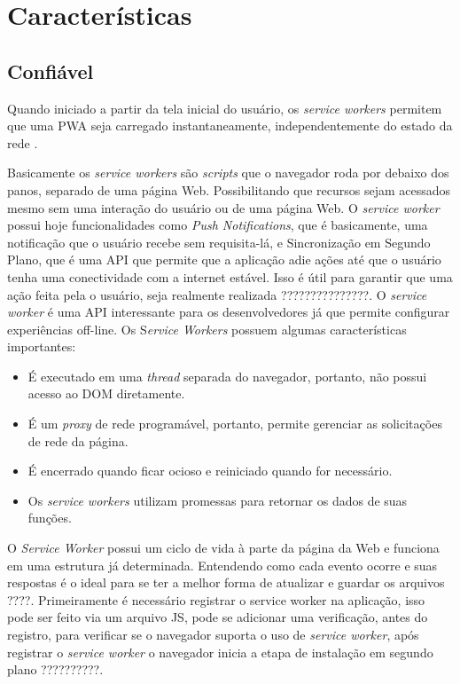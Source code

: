 \section{Características}
\label{s_c4_caractetisticas}

\subsection{Confiável}
Quando iniciado a partir da tela inicial do usuário, os \textit{service workers} permitem que uma \ac{PWA} seja carregado instantaneamente, independentemente do estado da rede \cite{pwa}.


Basicamente os \textit{service workers} são \textit{scripts} que o navegador roda por debaixo dos panos, separado de uma página Web. Possibilitando que recursos sejam acessados mesmo sem uma interação do usuário ou de uma página Web. O \textit{service worker} possui hoje funcionalidades como \textit{Push Notifications}, que é basicamente, uma notificação que o usuário recebe sem requisita-lá, e Sincronização em Segundo Plano, que é uma \ac{API} que permite que a aplicação adie ações até que o usuário tenha uma conectividade com a internet estável. Isso é útil para garantir que uma ação feita pela o usuário, seja realmente realizada \cite{servicework} ???????????????.
O \textit{service worker} é uma \ac{API} interessante para os desenvolvedores já que permite configurar experiências off-line. Os S\textit{ervice Workers} possuem algumas características importantes:

\begin{itemize}
	\item É executado em uma \textit{thread} separada do navegador, portanto, não possui acesso ao \ac{DOM} diretamente.
	\item É um \textit{proxy} de rede programável, portanto, permite gerenciar as solicitações de rede da página.
	\item É encerrado quando ficar ocioso e reiniciado quando for necessário.
	\item Os \textit{service workers} utilizam promessas para retornar os dados de suas funções.
\end{itemize}

O \textit{Service Worker} possui um ciclo de vida à parte da página da Web e funciona em uma estrutura já determinada. Entendendo como cada evento ocorre e suas respostas é o ideal para se ter a melhor forma de atualizar e guardar os arquivos \cite{pwa2} ????. Primeiramente é necessário registrar o service worker na aplicação, isso pode ser feito via um arquivo \ac{JS}, pode se adicionar uma verificação, antes do registro, para verificar se o navegador suporta o uso de \textit{service worker}, após registrar o \textit{service worker} o navegador inicia a etapa de instalação em segundo plano ??????????.

